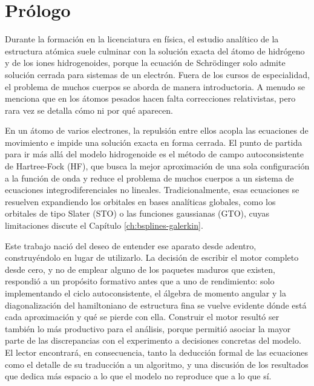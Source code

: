 \chapter*{Prólogo}
\label{ch:prologo}

Durante la formación en la licenciatura en física, el estudio analítico de la estructura atómica suele culminar con la solución exacta del átomo de hidrógeno y de los iones hidrogenoides, porque la ecuación de Schrödinger solo admite solución cerrada para sistemas de un electrón. Fuera de los cursos de especialidad, el problema de muchos cuerpos se aborda de manera introductoria. A menudo se menciona que en los átomos pesados hacen falta correcciones relativistas, pero rara vez se detalla cómo ni por qué aparecen.

En un átomo de varios electrones, la repulsión entre ellos acopla las ecuaciones de movimiento e impide una solución exacta en forma cerrada. El punto de partida para ir más allá del modelo hidrogenoide es el método de campo autoconsistente de Hartree-Fock (HF), que busca la mejor aproximación de una sola configuración a la función de onda y reduce el problema de muchos cuerpos a un sistema de ecuaciones integrodiferenciales no lineales. Tradicionalmente, esas ecuaciones se resuelven expandiendo los orbitales en bases analíticas globales, como los orbitales de tipo Slater (STO) o las funciones gaussianas (GTO), cuyas limitaciones discute el Capítulo \ref{ch:bsplines-galerkin}.

Este trabajo nació del deseo de entender ese aparato desde adentro, construyéndolo en lugar de utilizarlo. La decisión de escribir el motor completo desde cero, y no de emplear alguno de los paquetes maduros que existen, respondió a un propósito formativo antes que a uno de rendimiento: solo implementando el ciclo autoconsistente, el álgebra de momento angular y la diagonalización del hamiltoniano de estructura fina se vuelve evidente dónde está cada aproximación y qué se pierde con ella. Construir el motor resultó ser también lo más productivo para el análisis, porque permitió asociar la mayor parte de las discrepancias con el experimento a decisiones concretas del modelo. El lector encontrará, en consecuencia, tanto la deducción formal de las ecuaciones como el detalle de su traducción a un algoritmo, y una discusión de los resultados que dedica más espacio a lo que el modelo no reproduce que a lo que sí.

